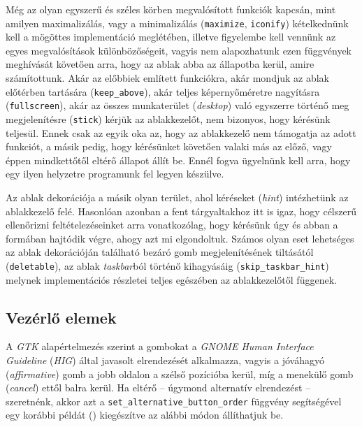 Még az olyan egyszerű és széles körben megvalósított funkciók kapcsán, mint amilyen maximalizálás, vagy a minimalizálás (\texttt{maximize}, \texttt{iconify}) kételkednünk kell a mögöttes implementáció meglétében, illetve figyelembe kell vennünk az egyes megvalósítások különbözőségeit, vagyis nem alapozhatunk ezen függvények meghívását követően arra, hogy az ablak abba az állapotba kerül, amire számítottunk. Akár az előbbiek említett funkciókra, akár mondjuk az ablak előtérben tartására (\texttt{keep\_above}), akár teljes képernyőméretre nagyításra (\texttt{fullscreen}), akár az összes munkaterület (\textit{desktop}) való egyszerre történő meg megjelenítésre (\texttt{stick}) kérjük az ablakkezelőt, nem bizonyos, hogy kérésünk teljesül. Ennek csak az egyik oka az, hogy az ablakkezelő nem támogatja az adott funkciót, a másik pedig, hogy kérésünket követően valaki más az előző, vagy éppen mindkettőtől eltérő állapot állít be. Ennél fogva ügyelnünk kell arra, hogy egy ilyen helyzetre programunk fel legyen készülve.

Az ablak dekorációja a másik olyan terület, ahol kéréseket (\textit{hint}) intézhetünk az ablakkezelő felé. Hasonlóan azonban a fent tárgyaltakhoz itt is igaz, hogy célszerű ellenőrizni feltételezéseinket arra vonatkozólag, hogy kérésünk úgy és abban a formában hajtódik végre, ahogy azt mi elgondoltuk. Számos olyan eset lehetséges az ablak dekorációján található bezáró gomb megjelenítésének tiltásától (\texttt{deletable}), az ablak \textit{taskbar}ból történő kihagyásáig (\texttt{skip\_taskbar\_hint}) melynek implementációs részletei teljes egészében az ablakkezelőtől függenek.

\subsection{Vezérlő elemek}

A \textit{GTK} alapértelmezés szerint a gombokat a \textit{GNOME Human Interface Guideline}\cite{gnomehig} (\textit{HIG}) által javasolt elrendezését alkalmazza, vagyis a jóváhagyó (\textit{affirmative}) gomb a jobb oldalon a szélső pozícióba kerül, míg a menekülő gomb (\textit{cancel}) ettől balra kerül. Ha eltérő -- úgymond alternatív elrendezést -- szeretnénk, akkor azt a \texttt{set\_alternative\_button\_order} függvény segítségével egy korábbi példát () kiegészítve az alábbi módon állíthatjuk be.

